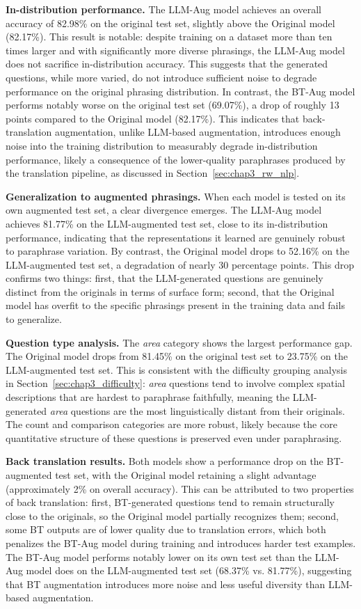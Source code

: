  
\textbf{In-distribution performance.}
The LLM-Aug model achieves an overall accuracy of
82.98\% on the original test set, slightly above the
Original model (82.17\%). This result is notable: despite
training on a dataset more than ten times larger and
with significantly more diverse phrasings, the LLM-Aug
model does not sacrifice in-distribution accuracy.
This suggests that the generated questions, while
more varied, do not introduce sufficient noise to
degrade performance on the original phrasing
distribution. In contrast, the BT-Aug model performs notably worse on
the original test set (69.07\%), a drop of roughly 13
points compared to the Original model (82.17\%). This
indicates that back-translation augmentation, unlike
LLM-based augmentation, introduces enough noise into the
training distribution to measurably degrade
in-distribution performance, likely a consequence of
the lower-quality paraphrases produced by the
translation pipeline, as discussed in
Section~\ref{sec:chap3_rw_nlp}.
 
\textbf{Generalization to augmented phrasings.}
When each model is tested on its own augmented test
set, a clear divergence emerges. The LLM-Aug model
achieves 81.77\% on the LLM-augmented test set,
close to its in-distribution performance, indicating
that the representations it learned are genuinely
robust to paraphrase variation. By contrast, the
Original model drops to 52.16\% on the LLM-augmented
test set, a degradation of nearly 30 percentage
points. This drop confirms two things: first,
that the LLM-generated questions are genuinely
distinct from the originals in terms of surface form;
second, that the Original model has overfit to the
specific phrasings present in the training data and
fails to generalize.
 
\textbf{Question type analysis.}
The \textit{area} category shows the largest performance gap.
The Original model drops from 81.45\% on the original
test set to 23.75\% on the LLM-augmented test set.
This is consistent with the difficulty grouping
analysis in Section~\ref{sec:chap3_difficulty}: \textit{area}
questions tend to involve complex spatial descriptions
that are hardest to paraphrase faithfully, meaning
the LLM-generated \textit{area} questions are the most
linguistically distant from their originals. The
count and comparison categories are more robust,
likely because the core quantitative structure of
these questions is preserved even under paraphrasing.
 
\textbf{Back translation results.}
Both models show a performance drop on the
BT-augmented test set, with the Original model
retaining a slight advantage (approximately 2\%
on overall accuracy). This can be attributed to
two properties of back translation: first, BT-generated
questions tend to remain structurally close to the
originals, so the Original model partially recognizes
them; second, some BT outputs are of lower quality
due to translation errors, which both penalizes the
BT-Aug model during training and introduces harder
test examples. The BT-Aug model performs notably
lower on its own test set than the LLM-Aug model
does on the LLM-augmented test set (68.37\% vs.
81.77\%), suggesting that BT augmentation introduces
more noise and less useful diversity than LLM-based
augmentation.
 
